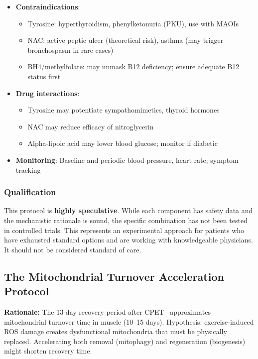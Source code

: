 \begin{itemize}
    \item \textbf{Contraindications}:
    \begin{itemize}
        \item Tyrosine: hyperthyroidism, phenylketonuria (PKU), use with MAOIs
        \item NAC: active peptic ulcer (theoretical risk), asthma (may trigger bronchospasm in rare cases)
        \item BH4/methylfolate: may unmask B12 deficiency; ensure adequate B12 status first
    \end{itemize}
    \item \textbf{Drug interactions}:
    \begin{itemize}
        \item Tyrosine may potentiate sympathomimetics, thyroid hormones
        \item NAC may reduce efficacy of nitroglycerin
        \item Alpha-lipoic acid may lower blood glucose; monitor if diabetic
    \end{itemize}
    \item \textbf{Monitoring}: Baseline and periodic blood pressure, heart rate; symptom tracking
\end{itemize}

\subsubsection{Qualification}

\begin{warning}
This protocol is \textbf{highly speculative}. While each component has safety data and the mechanistic rationale is sound, the specific combination has not been tested in controlled trials. This represents an experimental approach for patients who have exhausted standard options and are working with knowledgeable physicians. It should not be considered standard of care.
\end{warning}

\subsection{The Mitochondrial Turnover Acceleration Protocol}
\label{subsec:mito-turnover-protocol}

\textbf{Rationale:} The 13-day recovery period after CPET~\cite{keller2024cpet} approximates mitochondrial turnover time in muscle (10--15 days). Hypothesis: exercise-induced ROS damage creates dysfunctional mitochondria that must be physically replaced. Accelerating both removal (mitophagy) and regeneration (biogenesis) might shorten recovery time.

